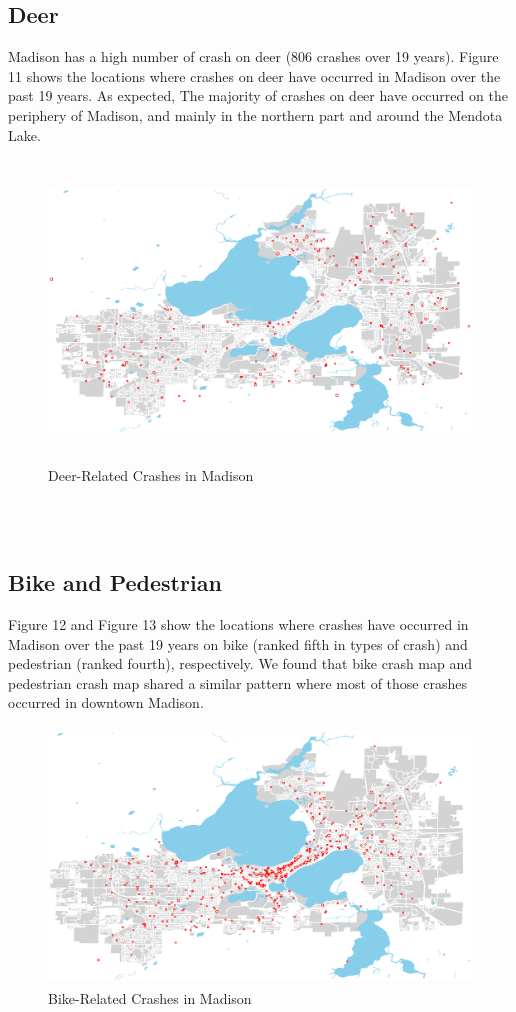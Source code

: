 \documentclass[15pt]{article}
\begin{document}
\subsection{Deer}
Madison has a high number of crash on deer (806 crashes over 19 years). Figure 11 shows the locations where crashes on deer have occurred in Madison over the past 19 years. As expected, The majority of crashes on deer have occurred on the periphery of Madison, and mainly in the northern part and around the Mendota Lake.
\begin{figure}[H]
\raggedleft
\includegraphics[height=80mm]{deer.eps}
\caption{Deer-Related Crashes in Madison}
\end{figure}

~\\
~\\
\subsection{Bike and Pedestrian}
Figure 12 and Figure 13 show the locations where crashes have occurred in Madison over the past 19 years on bike (ranked fifth in types of crash) and pedestrian (ranked fourth), respectively. We found that bike crash map and pedestrian crash map shared a similar pattern where most of those crashes occurred in downtown Madison.
\begin{figure}[H]
\raggedleft
\includegraphics[height=68mm]{bike.eps}
\caption{Bike-Related Crashes in Madison}
\end{figure}
\end{document}
